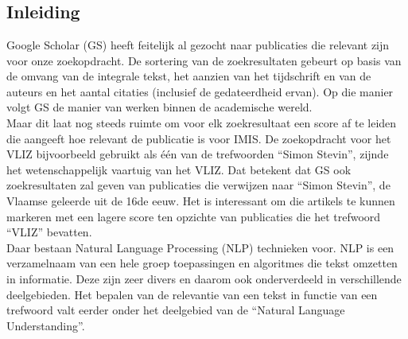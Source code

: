 
\chapter{}%
\label{ch:natural_language_processing}

\section{Inleiding}
Google Scholar (GS) heeft feitelijk al gezocht naar publicaties die relevant zijn voor onze zoekopdracht. De sortering van de zoekresultaten gebeurt op basis van de omvang van de integrale tekst, het aanzien van het tijdschrift en van de auteurs en het aantal citaties (inclusief de gedateerdheid ervan). Op die manier volgt GS de manier van werken binnen de academische wereld.\\
Maar dit laat nog steeds ruimte om voor elk zoekresultaat een score af te leiden die aangeeft hoe relevant de publicatie is voor IMIS. De zoekopdracht voor het VLIZ bijvoorbeeld gebruikt als één van de trefwoorden ``Simon Stevin'', zijnde het wetenschappelijk vaartuig van het VLIZ. Dat betekent dat GS ook zoekresultaten zal geven van publicaties die verwijzen naar ``Simon Stevin'', de Vlaamse geleerde uit de 16de eeuw. Het is interessant om die artikels te kunnen markeren met een lagere score ten opzichte van publicaties die het trefwoord ``VLIZ'' bevatten.\\
Daar bestaan Natural Language Processing (NLP) technieken voor. NLP is een verzamelnaam van een hele groep toepassingen en algoritmes die tekst omzetten in informatie. Deze zijn zeer divers en daarom ook onderverdeeld in verschillende deelgebieden. Het bepalen van de relevantie van een tekst in functie van een trefwoord valt eerder onder het deelgebied van de ``Natural Language Understanding''.\\


